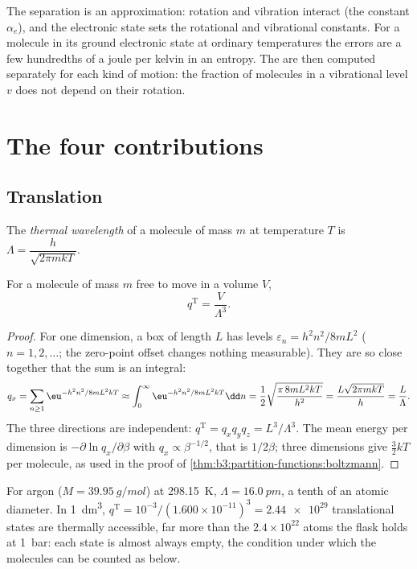 The separation is an approximation: rotation and vibration interact (the
constant $\alpha_e$), and the electronic state sets the rotational and vibrational
constants. For a molecule in its ground electronic state at ordinary
temperatures the errors are a few hundredths of a joule per kelvin in an
entropy. The  are then computed separately for each kind of motion:
the fraction of molecules in a vibrational level $v$ does not depend on their
rotation.

\section{The four contributions}

\subsection*{Translation}

\begin{definition}\label{def:b3:partition-functions:thermal-wavelength}
The \emph{thermal wavelength} of a molecule of mass $m$ at
temperature $T$ is $\Lambda = \dfrac{h}{\sqrt{2\pi mkT}}$.
\end{definition}

\begin{proposition}\label{prop:b3:partition-functions:q-trans}
For a molecule of mass $m$ free to move in a volume $V$,
\[
  q^{\mathrm T} = \frac{V}{\Lambda^3}.
\]
\end{proposition}

\begin{proof}
For one dimension, a box of length $L$ has levels $\varepsilon_n = h^2n^2/8mL^2$
($n = 1, 2, \dots$; the zero-point offset changes nothing measurable). They are so
close together that the sum is an integral:
\[
  q_x = \sum_{n\ge1}\eu^{-h^2n^2/8mL^2kT} \approx \int_0^\infty\eu^{-h^2n^2/8mL^2kT}\dd n
      = \frac12\sqrt{\frac{\pi\,8mL^2kT}{h^2}} = \frac{L\sqrt{2\pi mkT}}{h} = \frac{L}{\Lambda}.
\]
The three directions are independent: $q^{\mathrm T} = q_xq_yq_z = L^3/\Lambda^3$. The
mean energy per dimension is $-\partial\ln q_x/\partial\beta$ with $q_x \propto \beta^{-1/2}$, that is
$1/2\beta$; three dimensions give $\frac32kT$ per molecule, as used in the proof of
\cref{thm:b3:partition-functions:boltzmann}.
\end{proof}

\begin{example}\label{ex:b3:partition-functions:argon}
For argon ($M = \qty{39.95}{g/mol}$) at \qty{298.15}{K}, $\Lambda = \qty{16.0}{pm}$, a tenth of an
atomic diameter. In \qty{1}{dm^3}, $q^{\mathrm T} = 10^{-3}/(1.600\times10^{-11})^3 = \num{2.44e29}$
translational states are thermally accessible, far more than the
$2.4\times10^{22}$ atoms the flask holds at \qty{1}{bar}: each state is almost always
empty, the condition under which the molecules can be counted as below.
\end{example}

